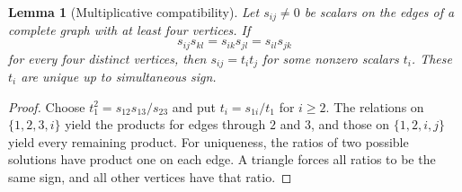 \documentclass[11pt]{article}
\newtheorem{lemma}[theorem]{Lemma}
\theoremstyle{remark}\newtheorem{remark}[theorem]{Remark}
\begin{document}
\begin{lemma}[Multiplicative compatibility]\label{lem:scalar-gluing}
Let $s_{ij}\ne0$ be scalars on the edges of a complete graph with at
least four vertices. If
\[
 s_{ij}s_{kl}=s_{ik}s_{jl}=s_{il}s_{jk}
\]
for every four distinct vertices, then $s_{ij}=t_it_j$ for some
nonzero scalars $t_i$. These $t_i$ are unique up to simultaneous sign.
\end{lemma}
\begin{proof}
Choose $t_1^2=s_{12}s_{13}/s_{23}$ and put $t_i=s_{1i}/t_1$ for
$i\geq2$. The relations on $\{1,2,3,i\}$ yield the products for
edges through $2$ and $3$, and those on $\{1,2,i,j\}$ yield every
remaining product. For uniqueness, the ratios of two possible
solutions have product one on each edge. A triangle forces all
ratios to be the same sign, and all other vertices have that ratio.
\end{proof}
\end{document}
